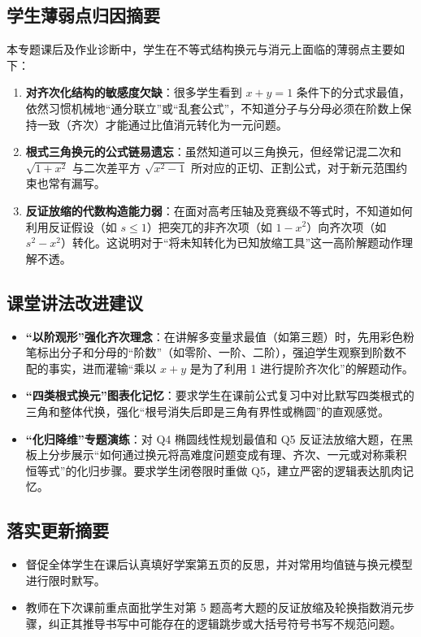 \documentclass[11pt,a4paper]{ctexart}
\begin{document}
\subsection{学生薄弱点归因摘要}
本专题课后及作业诊断中，学生在不等式结构换元与消元上面临的薄弱点主要如下：
\begin{enumerate}[label=\arabic*. , leftmargin=2em, itemsep=0.1em, topsep=0.2em]
  \item \textbf{对齐次化结构的敏感度欠缺}：很多学生看到 \(x+y=1\) 条件下的分式求最值，依然习惯机械地“通分联立”或“乱套公式”，不知道分子与分母必须在阶数上保持一致（齐次）才能通过比值消元转化为一元问题。
  \item \textbf{根式三角换元的公式链易遗忘}：虽然知道可以三角换元，但经常记混二次和 \(\sqrt{1+x^2}\) 与二次差平方 \(\sqrt{x^2-1}\) 所对应的正切、正割公式，对于新元范围约束也常有漏写。
  \item \textbf{反证放缩的代数构造能力弱}：在面对高考压轴及竞赛级不等式时，不知道如何利用反证假设（如 \(s \leqslant 1\)）把突兀的非齐次项（如 \(1-x^2\)）向齐次项（如 \(s^2-x^2\)）转化。这说明对于“将未知转化为已知放缩工具”这一高阶解题动作理解不透。
\end{enumerate}

\subsection{课堂讲法改进建议}
\begin{itemize}[leftmargin=2em, itemsep=0.1em, topsep=0.2em]
  \item \textbf{“以阶观形”强化齐次理念}：在讲解多变量求最值（如第三题）时，先用彩色粉笔标出分子和分母的“阶数”（如零阶、一阶、二阶），强迫学生观察到阶数不配的事实，进而灌输“乘以 \(x+y\) 是为了利用 1 进行提阶齐次化”的解题动作。
  \item \textbf{“四类根式换元”图表化记忆}：要求学生在课前公式复习中对比默写四类根式的三角和整体代换，强化“根号消失后即是三角有界性或椭圆”的直观感觉。
  \item \textbf{“化归降维”专题演练}：对 Q4 椭圆线性规划最值和 Q5 反证法放缩大题，在黑板上分步展示“如何通过换元将高难度问题变成有理、齐次、一元或对称乘积恒等式”的化归步骤。要求学生闭卷限时重做 Q5，建立严密的逻辑表达肌肉记忆。
\end{itemize}

\subsection{落实更新摘要}
\begin{itemize}[leftmargin=2em, itemsep=0.1em, topsep=0.2em]
  \item 督促全体学生在课后认真填好学案第五页的反思，并对常用均值链与换元模型进行限时默写。
  \item 教师在下次课前重点面批学生对第 5 题高考大题的反证放缩及轮换指数消元步骤，纠正其推导书写中可能存在的逻辑跳步或大括号符号书写不规范问题。
\end{itemize}
\end{document}
